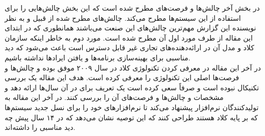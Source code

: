 \documentclass[a4paper, 12pt]{article}
\begin{document}
در بخش آخر چالش‌ها و فرصت‌های
مطرح شده است که این بخش چالش‌هایی را برای استفاده از این سیستم‌ها مطرح می‌کند.
چالش‌های مطرح شده از قبیل
و
به نظر نویسنده این گزارش مهم‌ترین چالش‌های این صنعت می‌باشند همانطوری که در ابتدای این مقاله
از طرف
مورد اول آن مطرح شده است.
مورد دوم به خاطر اینکه سازمان کلاد و مدل آن در ارائه‌دهنده‌های تجاری
غیر قابل دسترس است باعث می‌شود که دید مناسبی برای بهینه‌سازی برنامه‌ها و یافتن ایراد‌ها نداشته باشیم. \\
در آخر این مقاله در معرفی کردن تکنولوژی کلاد در سال ۲۰۰۹ موفق بوده و چالش‌ها و فرصت‌ها
اصلی این تکنولوژی را معرفی کرده است.
هدف این مقاله یک بررسی تکنیکال نبوده است و صرفاً سعی کرده است یک تعریف برای
در آن سال‌ها ارائه دهد و مشخصات و چالش‌ها و فرصت‌های آن را بررسی کنند.
در آخر این مقاله به تولید‌کنندگان نرم‌افزار پیشنهاد می‌کند تا نرم‌افزار‌های خود را برای
نسل جدید سیستم‌ها که بر پایه کلاد هستند طراحی کنند که این توصیه نشان می‌دهد
که در ۱۴ سال پیش چه دید مناسبی را داشته‌اند.
\end{document}
